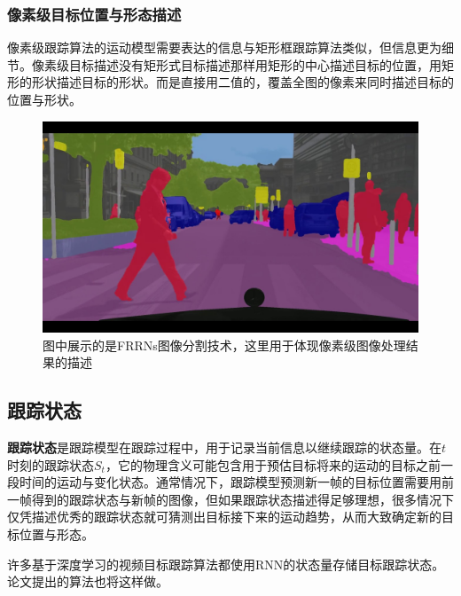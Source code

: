 \subsubsection{像素级目标位置与形态描述}
像素级跟踪算法的运动模型需要表达的信息与矩形框跟踪算法类似，但信息更为细节。像素级目标描述没有矩形式目标描述那样用矩形的中心描述目标的位置，用矩形的形状描述目标的形状。而是直接用二值的，覆盖全图的像素来同时描述目标的位置与形状。
\par
\begin{figure}[htbp!]
    \centering
    \includegraphics[width = 1.\textwidth]{chap/img/maxresdefault.jpg}
    \caption{图中展示的是FRRNs图像分割技术\supercite{frnn_youtube}\supercite{pohlen2017full}，这里用于体现像素级图像处理结果的描述}
    \label{fig:bunding_boxes}
\end{figure}
\par

\subsection{跟踪状态} \label{section:tracking_state}
\textbf{跟踪状态}是跟踪模型在跟踪过程中，用于记录当前信息以继续跟踪的状态量。在$t$时刻的跟踪状态$S_t$，它的物理含义可能包含用于预估目标将来的运动的目标之前一段时间的运动与变化状态。通常情况下，跟踪模型预测新一帧的目标位置需要用前一帧得到的跟踪状态与新帧的图像，但如果跟踪状态描述得足够理想，很多情况下仅凭描述优秀的跟踪状态就可猜测出目标接下来的运动趋势，从而大致确定新的目标位置与形态。
\par
许多基于深度学习的视频目标跟踪算法都使用RNN的状态量存储目标跟踪状态。论文提出的算法也将这样做。

